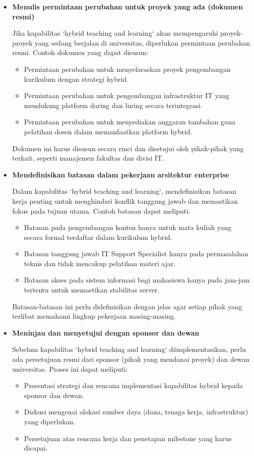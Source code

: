 \begin{itemize}
	\item \textbf{Menulis permintaan perubahan untuk proyek yang ada (dokumen resmi)}
	
	Jika kapabilitas `hybrid teaching and learning` akan mempengaruhi proyek-proyek yang sedang berjalan di universitas, diperlukan permintaan perubahan resmi. Contoh dokumen yang dapat disusun:
	\begin{itemize}
		\item Permintaan perubahan untuk menyelaraskan proyek pengembangan kurikulum dengan strategi hybrid.
		\item Permintaan perubahan untuk pengembangan infrastruktur IT yang mendukung platform daring dan luring secara terintegrasi.
		\item Permintaan perubahan untuk menyediakan anggaran tambahan guna pelatihan dosen dalam memanfaatkan platform hybrid.
	\end{itemize}
	
	Dokumen ini harus disusun secara rinci dan disetujui oleh pihak-pihak yang terkait, seperti manajemen fakultas dan divisi IT.
	
	\item \textbf{Mendefinisikan batasan dalam pekerjaan arsitektur enterprise}
	
	Dalam kapabilitas `hybrid teaching and learning`, mendefinisikan batasan kerja penting untuk menghindari konflik tanggung jawab dan memastikan fokus pada tujuan utama. Contoh batasan dapat meliputi:
	\begin{itemize}
		\item Batasan pada pengembangan konten hanya untuk mata kuliah yang secara formal terdaftar dalam kurikulum hybrid.
		\item Batasan tanggung jawab IT Support Specialist hanya pada permasalahan teknis dan tidak mencakup pelatihan materi ajar.
		\item Batasan akses pada sistem informasi bagi mahasiswa hanya pada jam-jam tertentu untuk memastikan stabilitas server.
	\end{itemize}
	
	Batasan-batasan ini perlu didefinisikan dengan jelas agar setiap pihak yang terlibat memahami lingkup pekerjaan masing-masing.
	
	\item \textbf{Meninjau dan menyetujui dengan sponsor dan dewan}
	
	Sebelum kapabilitas `hybrid teaching and learning` diimplementasikan, perlu ada persetujuan resmi dari sponsor (pihak yang mendanai proyek) dan dewan universitas. Proses ini dapat meliputi:
	\begin{itemize}
		\item Presentasi strategi dan rencana implementasi kapabilitas hybrid kepada sponsor dan dewan.
		\item Diskusi mengenai alokasi sumber daya (dana, tenaga kerja, infrastruktur) yang diperlukan.
		\item Persetujuan atas rencana kerja dan penetapan milestone yang harus dicapai.
	\end{itemize}
	

\end{itemize}
